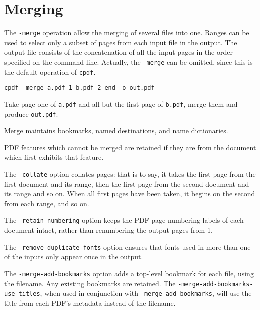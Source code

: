 \documentclass{book}
\newcommand{\cpdf}{\texttt{cpdf}}
\begin{document}
  \vspace{12mm}
  \section{Merging}
  The \texttt{-merge} operation allow the merging of several files into one.
Ranges can be used to select only a subset of pages from each
input file in the output. The output file consists of the concatenation of all
the input pages in the order specified on the command line. Actually, the
\texttt{-merge} can be omitted, since this is the default operation of \cpdf.

  \begin{framed}\small
    \verb!cpdf -merge a.pdf 1 b.pdf 2-end -o out.pdf!

    \vspace{2.5mm}
    \noindent Take page one of \texttt{a.pdf} and all but the first page of
\texttt{b.pdf}, merge them and produce \texttt{out.pdf}.
  \end{framed}

\noindent Merge maintains bookmarks, named destinations, and name dictionaries.

PDF features which cannot be merged are retained if they are from
the document which first exhibits that feature.

The \texttt{-collate} option collates pages: that is to say, it takes the first page from the first document and its range, then the first page from the second document and its range and so on. When all first pages have been taken, it begins on the second from each range, and so on.

The \texttt{-retain-numbering} option keeps the PDF page numbering labels of
each document intact, rather than renumbering the output pages from 1.

The \texttt{-remove-duplicate-fonts} option ensures that fonts used in more than one
of the inputs only appear once in the output.

The \texttt{-merge-add-bookmarks} option adds a top-level bookmark for each file, using the filename. Any existing bookmarks are retained. The \texttt{-merge\--add\--bookmarks\--use\--titles}, when used in conjunction with \texttt{-merge-add-bookmarks}, will use the title from each PDF's metadata instead of the filename.
\end{document}
